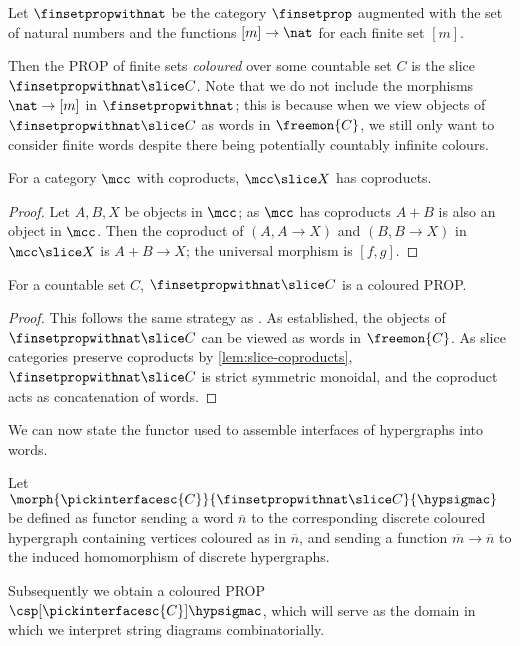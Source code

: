 \begin{definition}
    Let \(\finsetpropwithnat\) be the category \(\finsetprop\) augmented with the
    set of natural numbers and the functions \([m] \to \nat\) for each finite
    set \([m]\).
\end{definition}

Then the PROP of finite sets \emph{coloured} over some countable set \(C\) is
the slice \(\finsetpropwithnat \slice C\).
Note that we do not include the morphisms \(\nat \to [m]\) in
\(\finsetpropwithnat\); this is because when we view objects of
\(\finsetpropwithnat \slice C\) as words in \(\freemon{C}\), we still only want
to consider finite words despite there being potentially countably infinite
colours.

\begin{lemma}
    \label{lem:slice-coproducts}
    For a category \(\mcc\) with coproducts, \(\mcc \slice X\) has coproducts.
\end{lemma}
\begin{proof}
    Let \(A,B,X\) be objects in \(\mcc\); as \(\mcc\) has coproducts \(A + B\)
    is also an object in \(\mcc\).
    Then the coproduct of \((A, A \to X)\) and \((B, B \to X)\) in
    \(\mcc \slice X\) is \(A + B \to X\); the universal morphism is \([f, g]\).
\end{proof}

\begin{proposition}
    \label{prop:hatfinsetprop-slice-is-coloured-prop}
    For a countable set \(C\), \(\finsetpropwithnat \slice C\) is a
    coloured PROP.
\end{proposition}
\begin{proof}
    This follows the same strategy as \cite[Prop. 2.23]{bonchi2022string}.
    As established, the objects of \(\finsetpropwithnat \slice C\) can be viewed
    as words in \(\freemon{C}\).
    As slice categories preserve coproducts by \cref{lem:slice-coproducts},
    \(\finsetpropwithnat \slice C\) is strict symmetric monoidal, and the
    coproduct acts as concatenation of words.
\end{proof}

We can now state the functor used to assemble interfaces of hypergraphs into
words.

\begin{definition}
    Let \(\morph{\pickinterfacesc{C}}{\finsetpropwithnat \slice C}{\hypsigmac}\)
    be defined as functor sending a word \(\overline{n}\) to the corresponding
    discrete coloured hypergraph containing vertices coloured as in
    \(\overline{n}\), and sending a function \(\overline{m} \to \overline{n}\)
    to the induced homomorphism of discrete hypergraphs.
\end{definition}

Subsequently we obtain a coloured PROP \(
    \csp[\pickinterfacesc{C}]{\hypsigmac}
\), which will serve as the domain in which we interpret string diagrams
combinatorially.